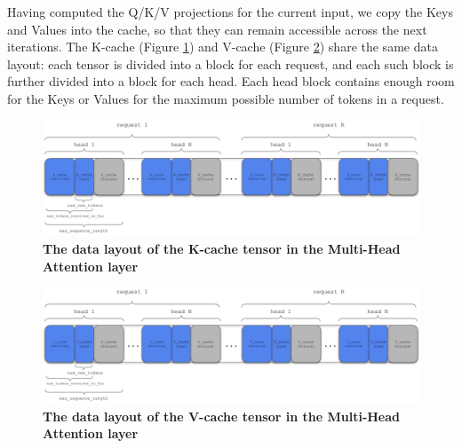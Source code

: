 Having computed the Q/K/V projections for the current input, we copy the Keys and Values into the cache, so that they can remain accessible across the next iterations. The K-cache (Figure \ref{fig:mha-kcache}) and V-cache (Figure \ref{fig:mha-vcache}) share the same data layout: each tensor is divided into a block for each request, and each such block is further divided into a block for each head. Each head block contains enough room for the Keys or Values for the maximum possible number of tokens in a request.

\begin{figure}[H]
    \centering
    \includegraphics[width=\linewidth]{figures/kcache_tensor2.png}
    \caption{\textbf{The data layout of the K-cache tensor in the Multi-Head Attention layer}}
    \label{fig:mha-kcache}
\end{figure}

\begin{figure}[H]
    \centering
    \includegraphics[width=\linewidth]{figures/vcache_tensor2.png}
    \caption{\textbf{The data layout of the V-cache tensor in the Multi-Head Attention layer}}
    \label{fig:mha-vcache}
\end{figure}

